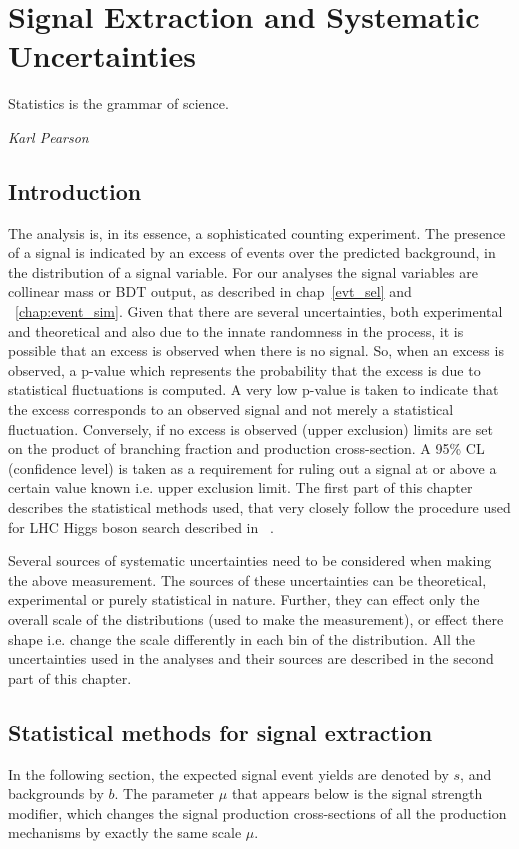 %
%

\chapter{Signal Extraction and Systematic Uncertainties}
\label{sig_ext}
\epigraph{Statistics is the grammar of science.}{\textit{Karl Pearson}}
\vskip 0.5in
\section{Introduction}
The analysis is, in its essence, a sophisticated counting experiment. The presence of a signal is indicated by an excess of events over the predicted background, in the distribution of a signal variable. For our analyses the signal variables are collinear mass or BDT output, as described in chap~\ref{evt_sel} and ~\ref{chap:event_sim}. Given that there are several uncertainties, both experimental and theoretical and also due to the innate randomness in the process, it is possible that an excess is observed when there is no signal. So, when an excess is observed, a p-value which represents the probability that the excess is due to statistical fluctuations is computed. A very low p-value is taken to indicate that the excess corresponds to an observed signal and not merely a statistical fluctuation. Conversely, if no excess is observed (upper exclusion) limits are set on the product of branching fraction and production cross-section. A 95\% CL (confidence level) is taken as a requirement for ruling out a signal at or above a certain value known i.e. upper exclusion limit. The first part of this chapter describes the statistical methods used, that very closely follow the procedure used for LHC Higgs boson search described in ~\cite{note2011}.

Several sources of systematic uncertainties need to be considered when making the above measurement. The sources of these uncertainties can be theoretical, experimental or purely statistical in nature. Further, they can effect only the overall scale of the distributions (used to make the measurement), or effect there shape i.e. change the scale differently in each bin of the distribution. All the uncertainties used in the analyses and their sources are described in the second part of this chapter.      



\section{Statistical methods for signal extraction}
\label{stat_meth}
In the following section, the expected signal event yields are denoted by $s$, and backgrounds by $b$. The parameter $\mu$ that appears below is the signal strength modifier, which changes the signal production cross-sections of all the production mechanisms by exactly the same scale $\mu$.

